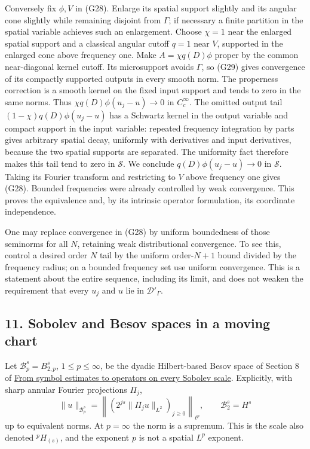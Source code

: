 \documentclass[
  11pt,
]{article}
\begin{document}
Conversely fix \(\phi,V\) in (G28). Enlarge its spatial support slightly
and its angular cone slightly while remaining disjoint from \(\Gamma\);
if necessary a finite partition in the spatial variable achieves such an
enlargement. Choose \(\chi=1\) near the enlarged spatial support and a
classical angular cutoff \(q=1\) near \(V\), supported in the enlarged
cone above frequency one. Make \(A=\chi q(D)\phi\) proper by the common
near-diagonal kernel cutoff. Its microsupport avoids \(\Gamma\), so
(G29) gives convergence of its compactly supported outputs in every
smooth norm. The properness correction is a smooth kernel on the fixed
input support and tends to zero in the same norms. Thus
\(\chi q(D)\phi(u_j-u)\to0\) in \(C_c^\infty\). The omitted output tail
\((1-\chi)q(D)\phi(u_j-u)\) has a Schwartz kernel in the output variable
and compact support in the input variable: repeated frequency
integration by parts gives arbitrary spatial decay, uniformly with
derivatives and input derivatives, because the two spatial supports are
separated. The uniformity fact therefore makes this tail tend to zero in
\(\mathcal S\). We conclude \(q(D)\phi(u_j-u)\to0\) in \(\mathcal S\).
Taking its Fourier transform and restricting to \(V\) above frequency
one gives (G28). Bounded frequencies were already controlled by weak
convergence. This proves the equivalence and, by its intrinsic operator
formulation, its coordinate independence.

One may replace convergence in (G28) by uniform boundedness of those
seminorms for all \(N\), retaining weak distributional convergence. To
see this, control a desired order \(N\) tail by the uniform
order-\(N+1\) bound divided by the frequency radius; on a bounded
frequency set use uniform convergence. This is a statement about the
entire sequence, including its limit, and does not weaken the
requirement that every \(u_j\) and \(u\) lie in \(\mathcal D'_\Gamma\).

\subsection{11. Sobolev and Besov spaces in a moving
chart}\label{sobolev-and-besov-spaces-in-a-moving-chart}

Let \(\mathcal B^s_p=B^s_{2,p}\), \(1\leq p\leq\infty\), be the dyadic
Hilbert-based Besov space of Section 8 of
\href{euclidean-symbol-calculus.pdf}{From symbol estimates to operators
on every Sobolev scale}. Explicitly, with sharp annular Fourier
projections \(\Pi_j\), \[
\|u\|_{\mathcal B^s_p}
=\left\|(2^{js}\|\Pi_j u\|_{L^2})_{j\geq0}\right\|_{\ell^p},
\qquad \mathcal B^s_2=H^s
\tag{G30}
\] up to equivalent norms. At \(p=\infty\) the norm is a supremum. This
is the scale also denoted \({}^pH_{(s)}\), and the exponent \(p\) is not
a spatial \(L^p\) exponent.
\end{document}
